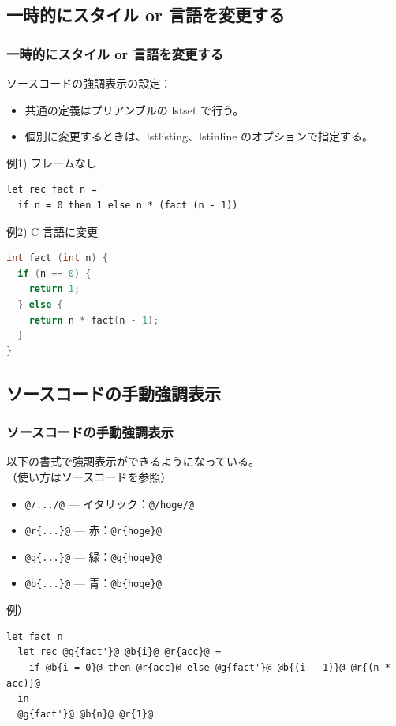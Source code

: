\documentclass[dvipdfmx,cjk,xcolor=dvipsnames,envcountsect,notheorems,12pt]{beamer}
\theoremstyle{definition}
\begin{document}
\subsection{一時的にスタイル or 言語を変更する}

\begin{frame}[fragile]%
  \frametitle{一時的にスタイル or 言語を変更する}
  ソースコードの強調表示の設定：
  \begin{itemize}
  \item 共通の定義はプリアンブルの lstset で行う。
  \item 個別に変更するときは、lstlisting、lstinline のオプションで指定する。
  \end{itemize}
  \vfill
  例1) フレームなし
\begin{lstlisting}[frame=none]
let rec fact n =
  if n = 0 then 1 else n * (fact (n - 1))
\end{lstlisting}
  \vfill
  例2) C 言語に変更
\begin{lstlisting}[language=C]
int fact (int n) {
  if (n == 0) {
    return 1;
  } else {
    return n * fact(n - 1);
  }
}
\end{lstlisting}
\end{frame}

\subsection{ソースコードの手動強調表示}

\begin{frame}[fragile]%
  \frametitle{ソースコードの手動強調表示}
  以下の書式で強調表示ができるようになっている。\\
  （使い方はソースコードを参照）
  \begin{itemize}
  \item \verb|@/.../@| --- イタリック：\lstinline|@/hoge/@|
  \item \verb|@r{...}@| --- 赤：\lstinline|@r{hoge}@|
  \item \verb|@g{...}@| --- 緑：\lstinline|@g{hoge}@|
  \item \verb|@b{...}@| --- 青：\lstinline|@b{hoge}@|
  \end{itemize}
  \vfill
  例）
\begin{lstlisting}
let fact n
  let rec @g{fact'}@ @b{i}@ @r{acc}@ =
    if @b{i = 0}@ then @r{acc}@ else @g{fact'}@ @b{(i - 1)}@ @r{(n * acc)}@
  in
  @g{fact'}@ @b{n}@ @r{1}@
\end{lstlisting}
\end{frame}
\end{document}
